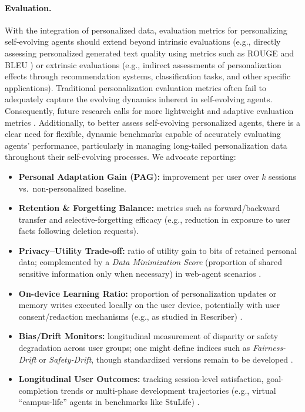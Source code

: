 \documentclass[10pt]{article} %
\begin{document}
\paragraph{Evaluation.}
With the integration of personalized data, evaluation metrics for personalizing self-evolving agents should extend beyond intrinsic evaluations (e.g., directly assessing personalized generated text quality using metrics such as ROUGE \citep{lin2004rouge} and BLEU \citep{papineni2002bleu}) or extrinsic evaluations (e.g., indirect assessments of personalization effects through recommendation systems, classification tasks, and other specific applications). Traditional personalization evaluation metrics often fail to adequately capture the evolving dynamics inherent in self-evolving agents. Consequently, future research calls for more lightweight and adaptive evaluation metrics \citep{zhang2024personalization}. Additionally, to better assess self-evolving personalized agents, there is a clear need for flexible, dynamic benchmarks capable of accurately evaluating agents' performance, particularly in managing long-tailed personalization data throughout their self-evolving processes. We advocate reporting: 
\begin{itemize}
\item \textbf{Personal Adaptation Gain (PAG):} improvement per user over $k$ sessions vs.\ non-personalized baseline.

\item \textbf{Retention \& Forgetting Balance:} metrics such as forward/backward transfer and selective-forgetting efficacy (e.g., reduction in exposure to user facts following deletion requests). 

\item \textbf{Privacy–Utility Trade-off:} ratio of utility gain to bits of retained personal data; complemented by a \emph{Data Minimization Score} (proportion of shared sensitive information only when necessary) in web-agent scenarios \citep{zharmagambetov2025agentdam}.

\item \textbf{On-device Learning Ratio:} proportion of personalization updates or memory writes executed locally on the user device, potentially with user consent/redaction mechanisms (e.g., as studied in Rescriber) \citep{zhou2025rescriber}.  

\item \textbf{Bias/Drift Monitors:} longitudinal measurement of disparity or safety degradation across user groups; one might define indices such as \emph{Fairness-Drift} or \emph{Safety-Drift}, though standardized versions remain to be developed \citep{basu2025fair,shao2025misevolution}.  

\item \textbf{Longitudinal User Outcomes:} tracking session-level satisfaction, goal-completion trends or multi-phase development trajectories (e.g., virtual “campus-life” agents in benchmarks like StuLife) \citep{cai2025building}.  

\end{itemize}
\end{document}

